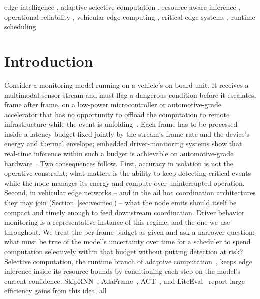 \documentclass[a4paper,fleqn]{cas-dc}
\begin{document}
\begin{keywords}
edge intelligence \sep
adaptive selective computation \sep
resource-aware inference \sep
operational reliability \sep
vehicular edge computing \sep
critical edge systems \sep
runtime scheduling
\end{keywords}
\maketitle
{}
\section{Introduction}
\label{sec:introducao}
Consider a monitoring model running on a vehicle's on-board unit. It receives a
multimodal sensor stream and must flag a dangerous condition before it escalates,
frame after frame, on a low-power microcontroller or automotive-grade accelerator
that has no opportunity to offload the computation to remote infrastructure while
the event is unfolding~\cite{bouhsissin2023driver,ortega2020dmd}. Each frame has to
be processed inside a latency budget fixed jointly by the stream's frame rate and
the device's energy and thermal envelope; embedded driver-monitoring systems show
that real-time inference within such a budget is achievable on automotive-grade
hardware~\cite{hariharan2023driveredge,tinydl2025driverstate}. Two consequences
follow. First, accuracy in isolation is not the operative constraint; what
matters is the ability to keep detecting critical events while the node manages
its energy and compute over uninterrupted operation. Second, in vehicular edge networks -- and in the ad hoc coordination
architectures they may join (Section~\ref{sec:vecmec}) -- what the node emits should itself be compact and timely enough to feed
downstream coordination. Driver behavior monitoring is a representative instance of
this regime, and the one we use throughout. We treat the per-frame budget as given
and ask a narrower question: what must be true of the model's uncertainty over time
for a scheduler to spend computation selectively within that budget without putting
detection at risk?
Selective computation, the runtime branch of adaptive
computation~\cite{han2022dynamic}, keeps edge inference inside its resource bounds
by conditioning each step on the model's current confidence. SkipRNN~\cite{campos2018skip},
AdaFrame~\cite{wu2019adaframe}, ACT~\cite{graves2016adaptive}, and
LiteEval~\cite{wu2019liteeval} report large efficiency gains from this idea, all
\end{document}
